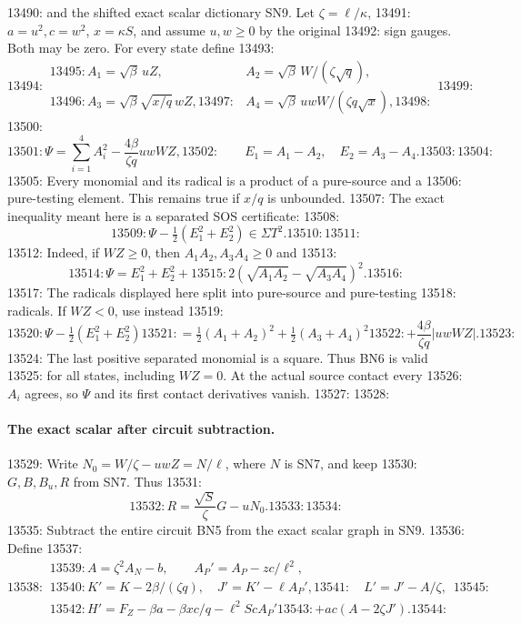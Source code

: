 13490: and the shifted exact scalar dictionary SN9. Let $\zeta=\ell/\kappa$,
13491: $a=u^2,c=w^2$, $x=\kappa S$, and assume $u,w\ge0$ by the original
13492: sign gauges. Both may be zero. For every state define
13493: \[
13494: \begin{array}{ll}
13495:  A_1=\sqrt\beta\,uZ,&A_2=\sqrt\beta\,W/(\zeta\sqrt q),\\
13496:  A_3=\sqrt\beta\sqrt{x/q}\,wZ,
13497:  &A_4=\sqrt\beta\,uwW/(\zeta q\sqrt x),
13498: \end{array}\tag{BN4}
13499: \]
13500: \[
13501:  \Psi=\sum_{i=1}^4 A_i^2-\frac{4\beta}{\zeta q}uwWZ,
13502:  \qquad E_1=A_1-A_2,\quad E_2=A_3-A_4.
13503:  \tag{BN5}
13504: \]
13505: Every monomial and its radical is a product of a pure-source and a
13506: pure-testing element. This remains true if $x/q$ is unbounded.
13507: The exact inequality meant here is a separated SOS certificate:
13508: \[
13509:                     \Psi-\tfrac12(E_1^2+E_2^2)\in\Sigma T^2.
13510:  \tag{BN6}
13511: \]
13512: Indeed, if $WZ\ge0$, then $A_1A_2,A_3A_4\ge0$ and
13513: \[
13514:  \Psi=E_1^2+E_2^2+
13515:               2(\sqrt{A_1A_2}-\sqrt{A_3A_4})^2.
13516: \]
13517: The radicals displayed here split into pure-source and pure-testing
13518: radicals. If $WZ<0$, use instead
13519: \[
13520:  \Psi-\tfrac12(E_1^2+E_2^2)
13521:  =\tfrac12(A_1+A_2)^2+\tfrac12(A_3+A_4)^2
13522:                   +\frac{4\beta}{\zeta q}|uwWZ|.
13523: \]
13524: The last positive separated monomial is a square. Thus BN6 is valid
13525: for all states, including $WZ=0$. At the actual source contact every
13526: $A_i$ agrees, so $\Psi$ and its first contact derivatives vanish.
13527: 
13528: \paragraph{The exact scalar after circuit subtraction.}
13529: Write $N_0=W/\zeta-uwZ=N/\ell$, where $N$ is SN7, and keep
13530: $G,B,B_u,R$ from SN7. Thus
13531: \[
13532:  R=\frac{\sqrt S}{\zeta}G-uN_0.
13533:  \tag{BN7}
13534: \]
13535: Subtract the entire circuit BN5 from the exact scalar graph in SN9.
13536: Define
13537: \[
13538: \begin{gathered}
13539:  A=\zeta^2 A_N-b,\qquad A_P'=A_P-zc/\ell^2,\\
13540:  K'=K-2\beta/(\zeta q),\quad J'=K'-\ell A_P',
13541:  \quad L'=J'-A/\zeta,\\
13542:  H'=F_Z-\beta a-\beta xc/q-\ell^2ScA_P'
13543:                           +ac(A-2\zeta J').
13544: \end{gathered}\tag{BN8}
13545: \]
